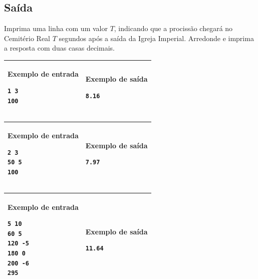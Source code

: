 \subsection*{Saída}

Imprima uma linha com um valor $T$, indicando que a procissão chegará no
Cemitério Real $T$ segundos após a saída da Igreja Imperial. Arredonde e imprima a resposta
com duas casas decimais.

\newpage
\begin{table}[!h]
\centering
\begin{tabular}{|l|l|}
\hline
\begin{minipage}[t]{3in}
\textbf{Exemplo de entrada}
\begin{verbatim}
1 3
100
\end{verbatim}
\vspace{1mm}
\end{minipage}
&
\begin{minipage}[t]{3in}
\textbf{Exemplo de saída}
\begin{verbatim}
8.16
\end{verbatim}
\vspace{1mm}
\end{minipage} \\
\hline
\end{tabular}
\end{table}

\begin{table}[!h]
\centering
\begin{tabular}{|l|l|}
\hline
\begin{minipage}[t]{3in}
\textbf{Exemplo de entrada}
\begin{verbatim}
2 3
50 5
100
\end{verbatim}
\vspace{1mm}
\end{minipage}
&
\begin{minipage}[t]{3in}
\textbf{Exemplo de saída}
\begin{verbatim}
7.97
\end{verbatim}
\vspace{1mm}
\end{minipage} \\
\hline
\end{tabular}
\end{table}

\begin{table}[!h]
\centering
\begin{tabular}{|l|l|}
\hline
\begin{minipage}[t]{3in}
\textbf{Exemplo de entrada}
\begin{verbatim}
5 10
60 5
120 -5
180 0
200 -6
295
\end{verbatim}
\vspace{1mm}
\end{minipage}
&
\begin{minipage}[t]{3in}
\textbf{Exemplo de saída}
\begin{verbatim}
11.64
\end{verbatim}
\vspace{1mm}
\end{minipage} \\
\hline
\end{tabular}
\end{table}
